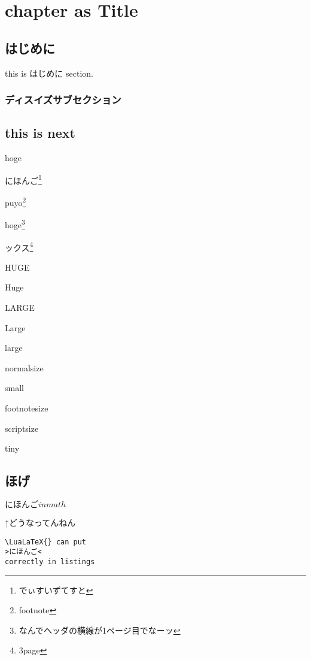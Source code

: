 \documentclass{word-lua}
\author{WORD太郎}
\subtitle{subtitleだぴょん}
\begin{document}
\chapter{chapter as Title}

\section{はじめに}
this is はじめに section.

\subsection{ディスイズサブセクション}

\section{this is next}

hoge

にほんご\footnote{でぃすいずてすと}

puyo\footnote{footnote}

hoge\footnote{なんでヘッダの横線が1ページ目でなーッ}

ックス\footnote{3page}

{\HUGE HUGE}

{\Huge Huge}

{\LARGE LARGE}

{\Large Large}

{\large large}

{\normalsize normalsize}

{\small small}

{\footnotesize footnotesize}

{\scriptsize scriptsize}

{\tiny tiny}

\newpage

\section{ほげ}

\newpage

$にほんごinmath$

\newpage
↑どうなってんねん

\lstset{language=TeX,numbers=left}
\begin{lstlisting}
\LuaLaTeX{} can put
>にほんご<
correctly in listings
\end{lstlisting}
\end{document}
